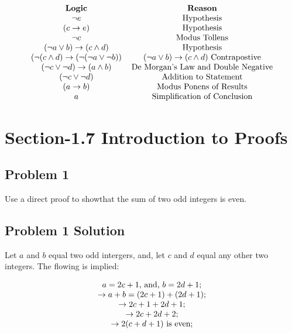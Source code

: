 \documentclass[11pt]{article}
\begin{document}
\begin{displaymath}
\begin{tabular}{c c}
	{\bf Logic} & {\bf Reason} \\
	$\lnot e$ & Hypothesis  \\
	$(c \to e)$ & Hypothesis  \\
	$\lnot c$ & Modus Tollens \\
	$(\lnot a \lor b) \to (c \land d)$ & Hypothesis \\
	$(\lnot (c  \land d) \to (\lnot (\lnot a \lor \lnot b))$ & $(\lnot a \lor b) \to (c \land d)$ Contrapostive \\
	$(\lnot c \lor \lnot d) \to (a \land b)$ & De Morgan's Law and Double Negative \\
	$(\lnot c \lor \lnot d)$ & Addition to Statement \\
	$(a \to b)$ & Modus Ponens of Results\\
	$a$ & Simplification of Conclusion  \\
\end{tabular}
\end{displaymath}

\section{Section-1.7 Introduction to Proofs}

\subsection{Problem 1}

Use a direct proof to showthat the sum of two odd integers is even.

\subsection{Problem 1 Solution}

Let $a$ and $b$ equal two odd intergers, and, let $c$ and $d$ equal any other two integers. The flowing is implied:

\begin{displaymath}
\begin{tabular}{c}
$a = 2c+ 1$, and, $b = 2d+1;$ \\
$\to a + b = (2c + 1) + (2d + 1);$ \\
$\to 2c+ 1 + 2d +1;$ \\
$\to 2c + 2d + 2;$ \\
$\to 2(c + d + 1)$ is even; \\
\end{tabular}
\end{displaymath}
\end{document}

